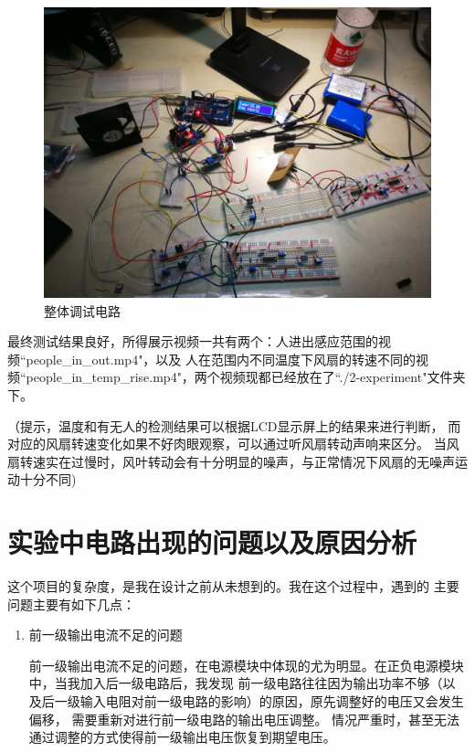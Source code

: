 \documentclass{article}
\begin{document}
\begin{spacing}{1.5}
    \begin{figure}[H]
        \centering
        \includegraphics[scale=0.2]{fig/result/total.png}
        \caption{整体调试电路}
        \label{fig:total}
    \end{figure}

    最终测试结果良好，所得展示视频一共有两个：人进出感应范围的视频“people\_in\_out.mp4"，以及
    人在范围内不同温度下风扇的转速不同的视频“people\_in\_temp\_rise.mp4"，两个视频现都已经放在了“./2-experiment"文件夹下。
    
    （提示，温度和有无人的检测结果可以根据LCD显示屏上的结果来进行判断，
    而对应的风扇转速变化如果不好肉眼观察，可以通过听风扇转动声响来区分。
    当风扇转速实在过慢时，风叶转动会有十分明显的噪声，与正常情况下风扇的无噪声运动十分不同)
    
\section{实验中电路出现的问题以及原因分析}    

这个项目的复杂度，是我在设计之前从未想到的。我在这个过程中，遇到的
主要问题主要有如下几点：

\begin{enumerate}
    \item 前一级输出电流不足的问题
    
    前一级输出电流不足的问题，在电源模块中体现的尤为明显。在正负电源模块中，当我加入后一级电路后，我发现
    前一级电路往往因为输出功率不够（以及后一级输入电阻对前一级电路的影响）的原因，原先调整好的电压又会发生偏移，
    需要重新对进行前一级电路的输出电压调整。
    情况严重时，甚至无法通过调整的方式使得前一级输出电压恢复到期望电压。


\end{enumerate}
\end{spacing}
\end{document}

